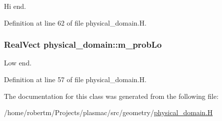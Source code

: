 Hi end. 



Definition at line 62 of file physical\+\_\+domain.\+H.

\subsubsection[{\texorpdfstring{m\+\_\+prob\+Lo}{m_probLo}}]{\setlength{\rightskip}{0pt plus 5cm}Real\+Vect physical\+\_\+domain\+::m\+\_\+prob\+Lo\hspace{0.3cm}{\ttfamily [protected]}}\hypertarget{classphysical__domain_a96fd1c64bca9449fd663c6aa01cd6c0c}{}\label{classphysical__domain_a96fd1c64bca9449fd663c6aa01cd6c0c}


Low end. 



Definition at line 57 of file physical\+\_\+domain.\+H.



The documentation for this class was generated from the following file\+:\begin{DoxyCompactItemize}
\item 
/home/robertm/\+Projects/plasmac/src/geometry/\hyperlink{physical__domain_8H}{physical\+\_\+domain.\+H}\end{DoxyCompactItemize}
